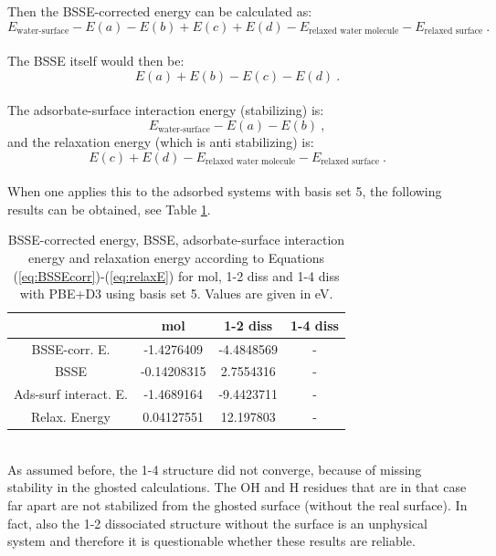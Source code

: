 \documentclass[11pt,DIV=13,BCOR=5mm,a4paper,headinclude]{scrbook}
\begin{document}
Then the BSSE-corrected energy can be calculated as:
\begin{equation}\label{eq:BSSEcorr}
 E_{\textrm{water-surface}}-E(a)-E(b)+E(c)+E(d)-E_{\textrm{relaxed water molecule}}-E_{\textrm{relaxed surface}} ~.
\end{equation}
\\
The BSSE itself would then be:
\begin{equation}
 E(a)+E(b)-E(c)-E(d) ~.
\end{equation}
\\
The adsorbate-surface interaction energy (stabilizing) is:
\begin{equation}
 E_{\textrm{water-surface}}-E(a)-E(b) ~,
\end{equation}
and the relaxation energy (which is anti stabilizing) is:
\begin{equation}\label{eq:relaxE}
 E(c)+E(d)-E_{\textrm{relaxed water molecule}}-E_{\textrm{relaxed surface}} ~.
\end{equation}
\\
When one applies this to the adsorbed systems with basis set 5, the following results can be obtained, see Table \ref{tab:bsse-results}.
\begin{table}[!h]
  \centering
   \caption{BSSE-corrected energy, BSSE, adsorbate-surface interaction energy and relaxation energy according to Equations (\ref{eq:BSSEcorr})-(\ref{eq:relaxE}) for mol, 1-2 diss and 1-4 diss with PBE+D3 using basis set 5.
Values are given in eV.}
  \begin{tabular}{c|ccc}
  \toprule
			& mol  & 1-2 diss & 1-4 diss \\\midrule
  BSSE-corr. E.		&-1.4276409 &-4.4848569 & -\\
  BSSE			&-0.14208315&2.7554316 & -\\
  Ads-surf interact. E.	&-1.4689164 &-9.4423711 & -\\
  Relax. Energy		&0.04127551 &12.197803 & -\\\bottomrule
  \end{tabular}
  \label{tab:bsse-results}
 \end{table}
 \\
As assumed before, the 1-4 structure did not converge, because of missing stability in the ghosted calculations.
The OH and H residues that are in that case far apart are not stabilized from the ghosted surface (without the real surface).
In fact, also the 1-2 dissociated structure without the surface is an unphysical system and therefore it is questionable whether these results are reliable.
\end{document}
